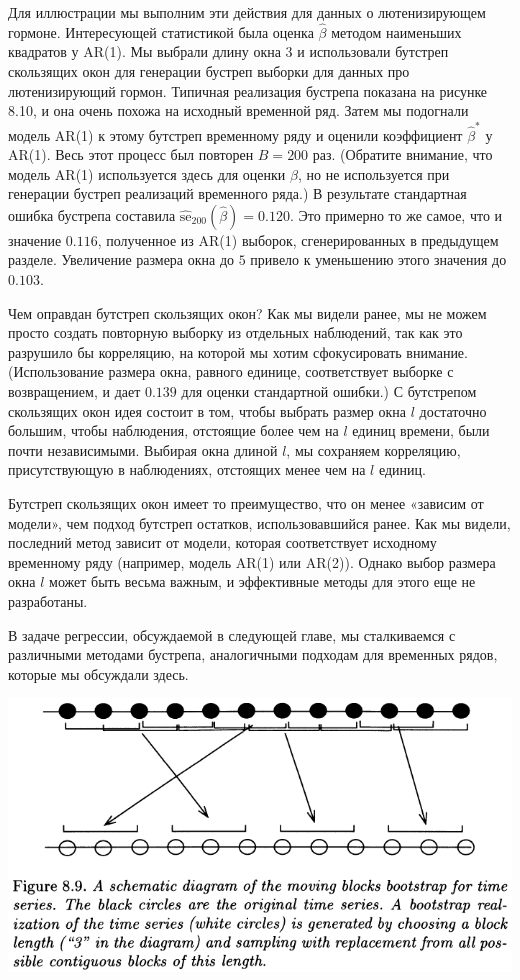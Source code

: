Для иллюстрации мы выполним эти действия для данных о лютенизирующем гормоне. Интересующей статистикой была оценка $\hat \beta$ методом наименьших квадратов у AR(1). Мы выбрали длину окна $3$ и использовали бутстреп скользящих окон для генерации бустреп выборки для данных про лютенизирующий гормон. Типичная реализация бустрепа показана на рисунке 8.10, и она очень похожа на исходный временной ряд. Затем мы подогнали модель AR(1) к этому бутстреп временному ряду и оценили коэффициент $\hat \beta^*$ у AR(1). Весь этот процесс был повторен $B=200$ раз. (Обратите внимание, что модель AR(1) используется здесь для оценки $\beta$, но не используется при генерации бустреп реализаций временного ряда.) В результате стандартная ошибка бустрепа составила $\widehat {\text{se}}_{200} (\hat \beta) = 0.120$. Это примерно то же самое, что и значение $0.116$, полученное из AR(1) выборок, сгенерированных в предыдущем разделе. Увеличение размера окна до $5$ привело к уменьшению этого значения до $0.103$.

Чем оправдан бутстреп скользящих окон? Как мы видели ранее, мы не можем просто создать повторную выборку из отдельных наблюдений, так как это разрушило бы корреляцию, на которой мы хотим сфокусировать внимание. (Использование размера окна, равного единице, соответствует выборке с возвращением, и дает $0.139$ для оценки стандартной ошибки.) С бутстрепом скользящих окон идея состоит в том, чтобы выбрать размер окна $l$ достаточно большим, чтобы наблюдения, отстоящие более чем на $l$ единиц времени, были почти независимыми. Выбирая окна длиной $l$, мы сохраняем корреляцию, присутствующую в наблюдениях, отстоящих менее чем на $l$ единиц.

Бутстреп скользящих окон имеет то преимущество, что он менее «зависим от модели», чем подход бутстреп остатков, использовавшийся ранее. Как мы видели, последний метод зависит от модели, которая соответствует исходному временному ряду (например, модель AR(1) или AR(2)). Однако выбор размера окна $l$ может быть весьма важным, и эффективные методы для этого еще не разработаны.

В задаче регрессии, обсуждаемой в следующей главе, мы сталкиваемся с различными методами бустрепа, аналогичными подходам для временных рядов, которые мы обсуждали здесь.

\noindent
\includegraphics[width=\linewidth]{8/f89}
\newline

